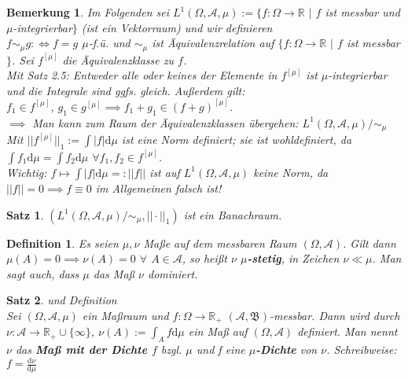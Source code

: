 \documentclass[a4paper,11pt]{book}
\newcommand{\R}{{\mathbb R}}
\def\AA{ \mathcal{A} }
\def\BB{ \mathfrak{B} }
\def\folgt{\ensuremath{\implies}}
\def\equizu{\ensuremath{\iff}}
\def\d{\mbox{d}}
\newtheorem{Def}{Definition}[chapter]
\newtheorem{Sa}{Satz}[chapter]
\newtheorem{Bem}{Bemerkung}[chapter]
\theoremstyle{nonumberplain}
\begin{document}
\begin{Bem}
Im Folgenden sei $L^1(\Omega, \AA, \mu):=\{f:\Omega\to\R$ $|$ $f$ ist messbar und $\mu$-integrierbar$\}$ (ist ein Vektorraum) und wir definieren \\
$f \sim_{\mu} g :\equizu f=g$ $\mu$-f.ü. und $\sim_{\mu}$ ist Äquivalenzrelation auf $\{f:\Omega\to\R$ $|$ $f$ ist messbar$\}$. Sei $f^{[\mu]}$ die Äquivalenzklasse zu $f$. \\
Mit Satz 2.5: Entweder alle oder keines der Elemente in $f^{[\mu]}$ ist $\mu$-integrierbar und die Integrale sind ggfs. gleich. Außerdem gilt: \\
$f_1 \in f^{[\mu]}$, $g_1 \in g^{[\mu]} \folgt f_1 + g_1 \in (f+g)^{[\mu]}$. \\
$\folgt$ Man kann zum Raum der Äquivalenzklassen übergehen: $L^1(\Omega,\AA,\mu)/\sim_{\mu}$ \\
Mit $||f^{[\mu]}||_1 := \int|f|\d\mu$ ist eine Norm definiert; sie ist wohldefiniert, da $\int f_1\d\mu = \int f_2\d\mu$ $\forall f_1,f_2 \in f^{[\mu]}$. \\
Wichtig: $f \mapsto \int|f|\d\mu =: ||f||$ ist auf $L^1(\Omega,\AA,\mu)$ keine Norm, da $||f|| = 0 \folgt f\equiv 0$ im Allgemeinen falsch ist!
\end{Bem}

\begin{Sa}
$(L^1(\Omega,\AA,\mu)/\sim_{\mu}, ||\cdot||_1)$ ist ein Banachraum.
\end{Sa}

\begin{Def}
Es seien $\mu, \nu$ Maße auf dem messbaren Raum $(\Omega,\AA)$. Gilt dann $\mu(A)=0 \folgt \nu(A) = 0$ $\forall$ $A\in\AA$, so heißt $\nu$ \textbf{$\mu$-stetig}, in Zeichen $\nu \ll \mu$. Man sagt auch, dass $\mu$ das Maß $\nu$ dominiert.
\end{Def}

\begin{Sa}und Definition \\
Sei $(\Omega,\AA,\mu)$ ein Maßraum und $f:\Omega\to\R_+$ $(\AA, \BB)$-messbar. Dann wird durch $\nu:\AA\to\R_+\cup\{\infty\}$, $\nu(A):=\int_A f\d\mu$ ein Maß auf $(\Omega,\AA)$ definiert. Man nennt $\nu$ das \textbf{Maß mit der Dichte $f$} bzgl. $\mu$ und f eine \textbf{$\mu$-Dichte} von $\nu$. Schreibweise: $f=\frac{\d\nu}{\d\mu}$
\end{Sa}
\end{document}
